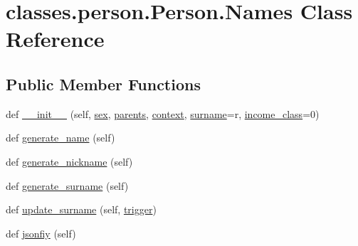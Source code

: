 \hypertarget{classclasses_1_1person_1_1Person_1_1Names}{}\section{classes.\+person.\+Person.\+Names Class Reference}
\label{classclasses_1_1person_1_1Person_1_1Names}
\subsection*{Public Member Functions}
\begin{DoxyCompactItemize}
\item 
def \hyperlink{classclasses_1_1person_1_1Person_1_1Names_ad445532c80f04e240c3e9744a4a72ab2}{\+\_\+\+\_\+init\+\_\+\+\_\+} (self, \hyperlink{classclasses_1_1person_1_1Person_1_1Names_a4a8c802683e259ab517153b317d8f74d}{sex}, \hyperlink{classclasses_1_1person_1_1Person_1_1Names_a63856a040505dcd495fe785eceabcfa6}{parents}, \hyperlink{classclasses_1_1person_1_1Person_1_1Names_a094596e282a776850329d575cedd4147}{context}, \hyperlink{classclasses_1_1person_1_1Person_1_1Names_a8942bf5d3f1d5442338cf188052d003b}{surname}=\textquotesingle{}r\textquotesingle{}, \hyperlink{classclasses_1_1person_1_1Person_a9b2e03e3daa500b11463837813ceb237}{income\+\_\+class}=0)
\item 
def \hyperlink{classclasses_1_1person_1_1Person_1_1Names_a2171039a1d80a9d1a3f2adc2c9843f82}{generate\+\_\+name} (self)
\item 
def \hyperlink{classclasses_1_1person_1_1Person_1_1Names_a750653acc64a9a00b17eab1eacc17727}{generate\+\_\+nickname} (self)
\item 
def \hyperlink{classclasses_1_1person_1_1Person_1_1Names_aa77d9e80f9952e81cee9844abbe29524}{generate\+\_\+surname} (self)
\item 
def \hyperlink{classclasses_1_1person_1_1Person_1_1Names_ac90013d34977e0227ce02626fd630e2a}{update\+\_\+surname} (self, \hyperlink{classclasses_1_1person_1_1Person_a332b1802c61834e52a330635d83bd65b}{trigger})
\item 
def \hyperlink{classclasses_1_1person_1_1Person_1_1Names_aae044342ab978905e1c35e67fc6b9bb7}{jsonfiy} (self)
\end{DoxyCompactItemize}
